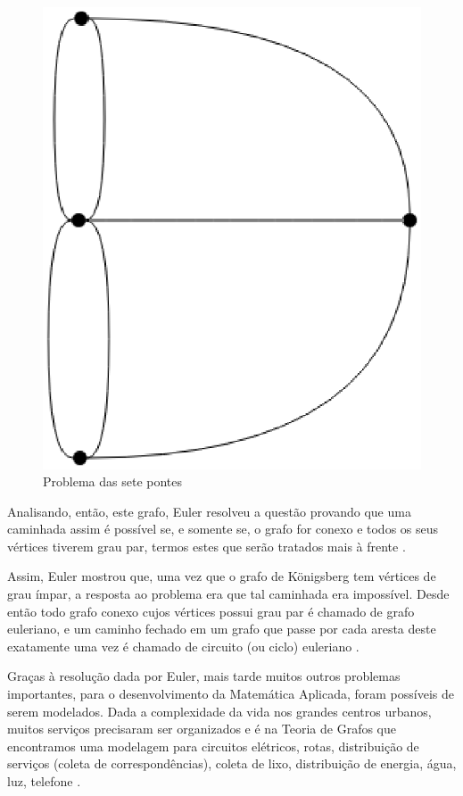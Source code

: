 \begin{figure}[!h]
	\centering
	\includegraphics[scale=0.5]{figuras/capitulo1/sete_pontes.eps}
	\caption{Problema das sete pontes}
	\label{sete_pontes}
\end{figure}

Analisando, então, este grafo, Euler resolveu a questão provando que uma caminhada assim é possível se, e somente se, o grafo for conexo e todos os seus vértices tiverem grau par, termos estes que serão tratados mais à frente \cite{Malta:2008}.

Assim, Euler mostrou que, uma vez que o grafo de Königsberg tem vértices de grau ímpar, a resposta ao problema era que tal caminhada era impossível. Desde então todo grafo conexo cujos vértices possui grau par é chamado de grafo euleriano, e um caminho fechado em um grafo que passe por cada aresta deste exatamente uma vez é chamado de circuito (ou ciclo) euleriano \cite{Malta:2008}.

Graças à resolução dada por Euler, mais tarde muitos outros problemas importantes, para o desenvolvimento da Matemática Aplicada, foram possíveis de serem modelados. Dada a complexidade da vida nos grandes centros urbanos, muitos serviços precisaram ser organizados e é na Teoria de Grafos que encontramos uma modelagem para circuitos elétricos, rotas, distribuição de serviços (coleta de correspondências), coleta de lixo, distribuição de energia, água, luz, telefone \cite{Mello:2007}.

